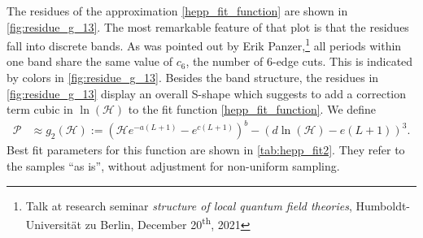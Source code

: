 \documentclass[11pt,a4paper]{article}
\newcommand{\period}{\mathcal P}
\renewcommand{\|}{\rule[-0.4ex]{0.2ex}{1.2em}}
\begin{document}
The residues of the approximation \cref{hepp_fit_function} are shown in \cref{fig:residue_g_13}. The most remarkable feature of that plot is that the residues fall into discrete bands. As was pointed out by Erik Panzer,\footnote{Talk at research seminar \emph{structure of local quantum field theories},  Humboldt-Universität zu Berlin, December 20\textsuperscript{th}, 2021} all periods within one band share the same value of $c_6$, the number of 6-edge cuts. This is  indicated by colors in \cref{fig:residue_g_13}.
Besides the band structure, the residues in \cref{fig:residue_g_13} display an overall S-shape which suggests to add a correction term cubic in $\ln(\mathcal H)$ to the fit function \cref{hepp_fit_function}. We define
\begin{align}\label{hepp_fit_function2}
	\period &\approx g_2(\mathcal H) := \left( \mathcal H e^{-a(L+1)} - e^{c(L+1)} \right) ^b - \left( d \ln (\mathcal H) -e (L+1) \right) ^3 .
\end{align}
Best fit parameters for this function are shown in \cref{tab:hepp_fit2}. They refer to the samples \enquote{as is}, without adjustment for non-uniform sampling.
\end{document}
